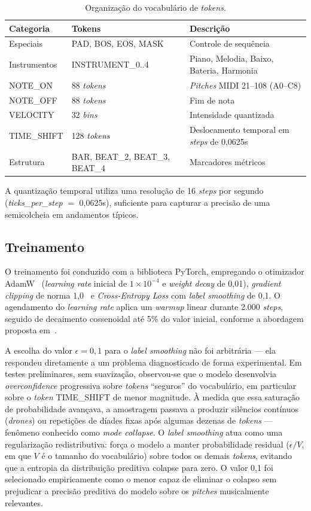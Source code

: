 \documentclass[12pt]{article}
\begin{document}
\begin{table}[ht]
\centering
\caption{Organização do vocabulário de \emph{tokens}.}
\label{tab:vocab}
\begin{tabular}{|l|l|l|}
\hline
\textbf{Categoria} & \textbf{Tokens} & \textbf{Descrição} \\
\hline
Especiais & PAD, BOS, EOS, MASK & Controle de sequência \\
Instrumentos & INSTRUMENT\_0..4 & Piano, Melodia, Baixo, Bateria, Harmonia \\
NOTE\_ON & 88 \emph{tokens} & \emph{Pitches} MIDI 21--108 (A0--C8) \\
NOTE\_OFF & 88 \emph{tokens} & Fim de nota \\
VELOCITY & 32 \emph{bins} & Intensidade quantizada \\
TIME\_SHIFT & 128 \emph{tokens} & Deslocamento temporal em \emph{steps} de 0,0625s \\
Estrutura & BAR, BEAT\_2, BEAT\_3, BEAT\_4 & Marcadores métricos \\
\hline
\end{tabular}
\end{table}

A quantização temporal utiliza uma resolução de 16 \emph{steps} por segundo
(\emph{ticks\_per\_step} $=$ 0,0625s), suficiente para capturar a precisão de uma
semicolcheia em andamentos típicos.

\subsection{Treinamento}

O treinamento foi conduzido com a biblioteca PyTorch, empregando o otimizador
AdamW~\cite{loshchilov2019} (\emph{learning rate} inicial de $1 \times 10^{-4}$ e
\emph{weight decay} de 0,01), \emph{gradient clipping} de norma
1,0~\cite{goodfellow2016} e \emph{Cross-Entropy Loss} com \emph{label smoothing}
de 0,1. O agendamento do \emph{learning rate} aplica um \emph{warmup} linear
durante 2.000 \emph{steps}, seguido de decaimento cossenoidal até 5\% do valor
inicial, conforme a abordagem proposta em~\cite{loshchilov2017}.

A escolha do valor $\epsilon = 0{,}1$ para o \emph{label smoothing} não foi
arbitrária --- ela respondeu diretamente a um problema diagnosticado de forma
experimental. Em testes preliminares, sem suavização, observou-se que o modelo
desenvolvia \emph{overconfidence} progressiva sobre \emph{tokens} ``seguros'' do
vocabulário, em particular sobre o \emph{token} TIME\_SHIFT de menor magnitude. À
medida que essa saturação de probabilidade avançava, a amostragem passava a
produzir silêncios contínuos (\emph{drones}) ou repetições de díades fixas após
algumas dezenas de \emph{tokens} --- fenômeno conhecido como \emph{mode collapse}.
O \emph{label smoothing} atua como uma regularização redistributiva: força o
modelo a manter probabilidade residual ($\epsilon/V$, em que $V$ é o tamanho do
vocabulário) sobre todos os demais \emph{tokens}, evitando que a entropia da
distribuição preditiva colapse para zero. O valor 0,1 foi selecionado
empiricamente como o menor capaz de eliminar o colapso sem prejudicar a precisão
preditiva do modelo sobre os \emph{pitches} musicalmente relevantes.
\end{document}
